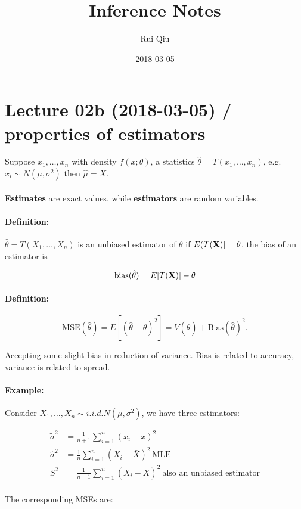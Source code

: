 \documentclass[a4paper, 11pt, twoside]{article}
\begin{document}
\title{Inference Notes}
\author{Rui Qiu}
\date{2018-03-05}

\maketitle

\section{Lecture 02b (2018-03-05) / properties of estimators}
Suppose $x_1,\dots,x_n$ with density $f(x;\theta)$, a statistics $\hat{\theta}=T(x_1,\dots,x_n)$, e.g. $x_i\sim N(\mu,\sigma^2)$ then $\hat{\mu}=\bar{X}.$\\
\\\textbf{Estimates} are exact values, while \textbf{estimators} are random variables.
\paragraph{Definition:} $\hat{\theta}=T(X_1,\dots,X_n)$ is an unbiased estimator of $\theta$ if $E(T(\bf{X})]=\theta$, the bias of an estimator is

\[\text{bias}(\hat{\theta})=E[T(\bf{X})]-\theta\]

\paragraph{Definition:}\[\text{MSE}(\hat{\theta})=E\left[(\hat{\theta}-\theta)^2\right]=V(\hat{\theta})+\text{Bias}(\hat{\theta})^2.\]

Accepting some slight bias in reduction of variance. Bias is related to accuracy, variance is related to spread.

\paragraph{Example:} Consider $X_1,\dots,X_n\sim i.i.d. N(\mu,\sigma^2)$, we have three estimators:

\[\begin{split}
\tilde{\sigma}^2&=\frac1{n+1}\sum^n_{i=1}(x_i-\bar{x})^2\\
\hat{\sigma}^2&=\frac1n\sum^n_{i=1}(X_i-\bar{X})^2\ \text{MLE}\\
S^2&=\frac1{n-1}\sum^n_{i=1}(X_i-\bar{X})^2\ \text{also an unbiased estimator}\\
\end{split}
\]

The corresponding MSEs are:
\end{document}
